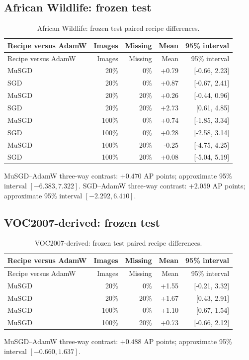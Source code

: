 \subsection{African Wildlife: frozen test}
\begin{longtable}{@{}lrrrr@{}}
\caption{African Wildlife: frozen test paired recipe differences.}\\
\toprule Recipe versus AdamW & Images & Missing & Mean & 95\% interval\\\midrule
\endfirsthead
\toprule Recipe versus AdamW & Images & Missing & Mean & 95\% interval\\\midrule
\endhead
MuSGD & 20\% & 0\% & +0.79 & [-0.66, 2.23]\\
SGD & 20\% & 0\% & +0.87 & [-0.67, 2.41]\\
MuSGD & 20\% & 20\% & +0.26 & [-0.44, 0.96]\\
SGD & 20\% & 20\% & +2.73 & [0.61, 4.85]\\
MuSGD & 100\% & 0\% & +0.74 & [-1.85, 3.34]\\
SGD & 100\% & 0\% & +0.28 & [-2.58, 3.14]\\
MuSGD & 100\% & 20\% & -0.25 & [-4.75, 4.25]\\
SGD & 100\% & 20\% & +0.08 & [-5.04, 5.19]\\
\bottomrule\end{longtable}
MuSGD--AdamW three-way contrast: $+0.470$ AP points; approximate 95\% interval $[-6.383, 7.322]$.
SGD--AdamW three-way contrast: $+2.059$ AP points; approximate 95\% interval $[-2.292, 6.410]$.
\subsection{VOC2007-derived: frozen test}
\begin{longtable}{@{}lrrrr@{}}
\caption{VOC2007-derived: frozen test paired recipe differences.}\\
\toprule Recipe versus AdamW & Images & Missing & Mean & 95\% interval\\\midrule
\endfirsthead
\toprule Recipe versus AdamW & Images & Missing & Mean & 95\% interval\\\midrule
\endhead
MuSGD & 20\% & 0\% & +1.55 & [-0.21, 3.32]\\
MuSGD & 20\% & 20\% & +1.67 & [0.43, 2.91]\\
MuSGD & 100\% & 0\% & +1.10 & [0.67, 1.54]\\
MuSGD & 100\% & 20\% & +0.73 & [-0.66, 2.12]\\
\bottomrule\end{longtable}
MuSGD--AdamW three-way contrast: $+0.488$ AP points; approximate 95\% interval $[-0.660, 1.637]$.
